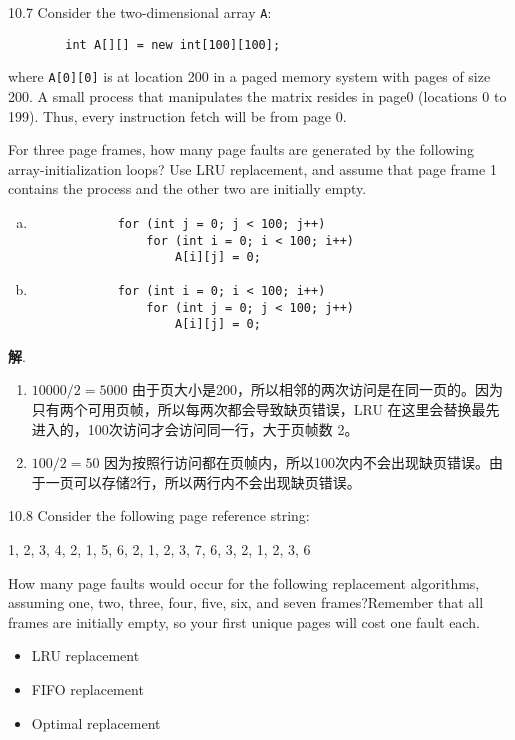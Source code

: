 \documentclass[12pt,a4paper]{article}
\newenvironment{problems}{\begin{list}{}{\renewcommand{\makelabel}[1]{\textbf{##1}\hfil}}}{\end{list}}
\providecommand{\sol}{\textbf{解}.~}
\begin{document}
\begin{problems}
    \item[10.7] Consider the two-dimensional array \verb"A":
     
    \begin{lstlisting}
        int A[][] = new int[100][100];
    \end{lstlisting} 
    where \verb"A[0][0]" is at location 200 in a paged memory system with pages of size 200. A small process that manipulates the matrix resides in page0 (locations 0 to 199). Thus, every instruction fetch will be from page 0.
    
    For three page frames, how many page faults are generated by the following array-initialization loops? Use LRU replacement, and assume
    that page frame 1 contains the process and the other two are initially empty.
    \begin{enumerate}[a.]
        \item \begin{verbatim}
            for (int j = 0; j < 100; j++)
                for (int i = 0; i < 100; i++)
                    A[i][j] = 0;
        \end{verbatim}
        \item \begin{verbatim}
            for (int i = 0; i < 100; i++)
                for (int j = 0; j < 100; j++)
                    A[i][j] = 0;
        \end{verbatim}
    \end{enumerate}

    \sol \begin{enumerate}
        \item $10000/2=5000$ 由于页大小是200，所以相邻的两次访问是在同一页的。因为只有两个可用页帧，所以每两次都会导致缺页错误，LRU 在这里会替换最先进入的，100次访问才会访问同一行，大于页帧数 2。
        \item $100/2=50$ 因为按照行访问都在页帧内，所以100次内不会出现缺页错误。由于一页可以存储2行，所以两行内不会出现缺页错误。
    \end{enumerate}

    \item[10.8] Consider the following page reference string:
    \begin{center}
        1, 2, 3, 4, 2, 1, 5, 6, 2, 1, 2, 3, 7, 6, 3, 2, 1, 2, 3, 6
    \end{center}
    How many page faults would occur for the following replacement algorithms, assuming one, two, three, four, five, six, and seven frames?Remember that all frames are initially empty, so your first unique pages will cost one fault each.
    \begin{itemize}
        \item LRU replacement
        \item FIFO replacement
        \item Optimal replacement
    \end{itemize}


\end{problems}
\end{document}
